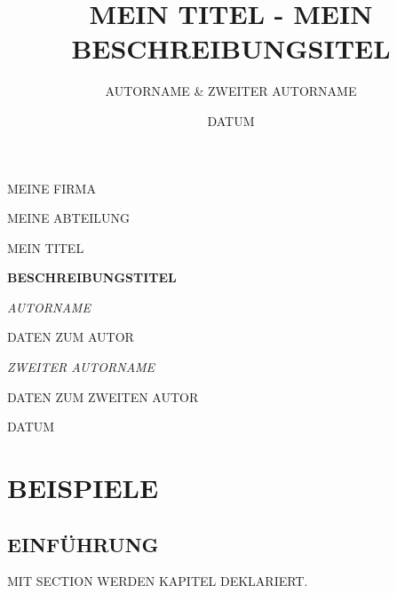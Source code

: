 \documentclass[a4paper,12pt]{report}
\title{MEIN TITEL - MEIN BESCHREIBUNGSITEL}
\author{AUTORNAME \& ZWEITER AUTORNAME}
\date{DATUM} %
\begin{document}

\begin{titlepage}
  \centering
  {\scshape\LARGE MEINE FIRMA \par}
  {\scshape MEINE ABTEILUNG \par}
  \vspace{1cm}
  {\scshape\Large MEIN TITEL\par}
  \vspace{1.5cm}
  {\huge\bfseries BESCHREIBUNGSTITEL \par}

  \vspace{2cm}
  {\Large{\itshape AUTORNAME}\par}
  {DATEN ZUM AUTOR\par}
  {\par}

  \vspace{2cm}
  {\Large{\itshape ZWEITER AUTORNAME}\par}
  {DATEN ZUM ZWEITEN AUTOR\par}
  {\par}

  \vfill

  {\large DATUM\par}
\end{titlepage}

\tableofcontents
\thispagestyle{fancy} %
\listoffigures
\thispagestyle{fancy} %
\listoftables
\thispagestyle{fancy} %

\chapter{BEISPIELE}
\thispagestyle{fancy} %
\section{EINFÜHRUNG}
\thispagestyle{fancy} %
MIT SECTION WERDEN KAPITEL DEKLARIERT.
\end{document}
